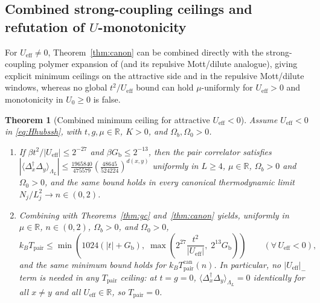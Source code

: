 \documentclass[11pt]{article}
\newtheorem{theorem}{Theorem}[section]
\theoremstyle{definition}
\theoremstyle{remark}
\newcommand{\R}{\mathbb{R}}
\newcommand{\eff}{\mathrm{eff}}
\newcommand{\pair}{\mathrm{pair}}
\newcommand{\Tpair}{T_{\pair}}
\newcommand{\Gb}{G_{\mathrm{b}}}
\newcommand{\Ueff}{U_{\eff}}
\begin{document}
\subsection{Combined strong-coupling ceilings and refutation of
\texorpdfstring{$U$}{U}-monotonicity}

For $\Ueff\ne0$, Theorem~\ref{thm:canon} can be combined directly with the
strong-coupling polymer expansion of \cite{sshbond3} (and its repulsive Mott/dilute
analogue), giving explicit minimum ceilings on the attractive side and in the
repulsive Mott/dilute windows, whereas no global $t^2/\Ueff$ bound can hold
$\mu$-uniformly for $\Ueff>0$ and monotonicity in $U_0\ge0$ is false.

\begin{theorem}[Combined minimum ceiling for attractive $\Ueff<0$]
\label{thm:min-att}
Assume $\Ueff<0$ in \eqref{eq:Hhubssh}, with $t,g,\mu\in\R$, $K>0$, and
$\Omega_b,\Omega_0>0$.
\begin{enumerate}[label=(\roman*),leftmargin=2.2em]
\item If $\beta t^2/|\Ueff|\le2^{-27}$ and $\beta\Gb\le2^{-13}$, then the pair
correlator satisfies $|\langle\Delta_x^\dagger\Delta_y\rangle_{\Lambda_L}|\le
\frac{1965840}{475579}(\frac{48645}{524224})^{d(x,y)}$ uniformly in
$L\ge4$, $\mu\in\R$, $\Omega_b>0$ and $\Omega_0>0$, and the same bound holds in
every canonical thermodynamic limit $N_j/L_j^2\to n\in(0,2)$.
\item Combining with Theorems~\ref{thm:gc} and~\ref{thm:canon} yields, uniformly in
$\mu\in\R$, $n\in(0,2)$, $\Omega_b>0$, and $\Omega_0>0$,
\begin{equation}
k_B\Tpair\le\min\!\left(1024(|t|+\Gb),\;
\max\!\left(2^{27}\frac{t^2}{|\Ueff|},\;2^{13}\Gb\right)\right)
\qquad(\forall\,\Ueff<0),
\label{eq:minatt}
\end{equation}
and the same minimum bound holds for $k_B\Tpair^{\mathrm{can}}(n)$. In particular, no
$|\Ueff|_-$ term is needed in any $\Tpair$ ceiling: at $t=g=0$,
$\langle\Delta_x^\dagger\Delta_y\rangle_{\Lambda_L}=0$ identically for all $x\ne y$
and all $\Ueff\in\R$, so $\Tpair=0$.
\end{enumerate}
\end{theorem}
\end{document}
